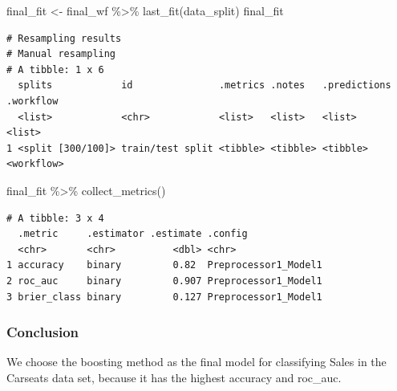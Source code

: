 \documentclass[
]{article}
\newenvironment{Shaded}{\begin{snugshade}}{\end{snugshade}}
\newcommand{\FunctionTok}[1]{\textcolor[rgb]{0.28,0.35,0.67}{#1}}
\newcommand{\NormalTok}[1]{\textcolor[rgb]{0.00,0.23,0.31}{#1}}
\newcommand{\OtherTok}[1]{\textcolor[rgb]{0.00,0.23,0.31}{#1}}
\newcommand{\SpecialCharTok}[1]{\textcolor[rgb]{0.37,0.37,0.37}{#1}}
\begin{document}
\begin{Shaded}
\begin{Highlighting}[]
\NormalTok{final\_fit }\OtherTok{\textless{}{-}} 
\NormalTok{  final\_wf }\SpecialCharTok{\%\textgreater{}\%}
  \FunctionTok{last\_fit}\NormalTok{(data\_split)}
\NormalTok{final\_fit}
\end{Highlighting}
\end{Shaded}

\begin{verbatim}
# Resampling results
# Manual resampling 
# A tibble: 1 x 6
  splits            id               .metrics .notes   .predictions .workflow 
  <list>            <chr>            <list>   <list>   <list>       <list>    
1 <split [300/100]> train/test split <tibble> <tibble> <tibble>     <workflow>
\end{verbatim}

\begin{Shaded}
\begin{Highlighting}[]
\NormalTok{final\_fit }\SpecialCharTok{\%\textgreater{}\%} 
  \FunctionTok{collect\_metrics}\NormalTok{()}
\end{Highlighting}
\end{Shaded}

\begin{verbatim}
# A tibble: 3 x 4
  .metric     .estimator .estimate .config             
  <chr>       <chr>          <dbl> <chr>               
1 accuracy    binary         0.82  Preprocessor1_Model1
2 roc_auc     binary         0.907 Preprocessor1_Model1
3 brier_class binary         0.127 Preprocessor1_Model1
\end{verbatim}

\hypertarget{conclusion-1}{%
\subsubsection{Conclusion}\label{conclusion-1}}

We choose the boosting method as the final model for classifying Sales
in the Carseats data set, because it has the highest accuracy and
roc\_auc.
\end{document}
